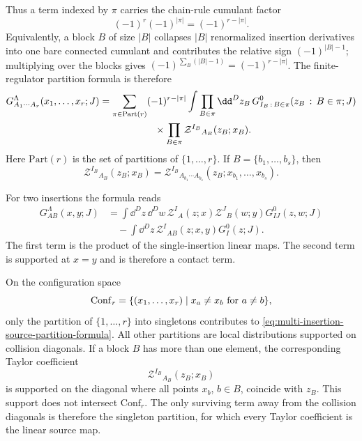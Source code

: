 Thus a term indexed by \(\pi\) carries the chain-rule cumulant factor
\[
  (-1)^r(-1)^{|\pi|}
  =
  (-1)^{r-|\pi|}.
\]
Equivalently, a block \(B\) of size \(|B|\) collapses \(|B|\) renormalized
insertion derivatives into one bare connected cumulant and contributes the
relative sign \((-1)^{|B|-1}\); multiplying over the blocks gives
\((-1)^{\sum_B(|B|-1)}=(-1)^{r-|\pi|}\).  The finite-regulator partition
formula is therefore
\begin{equation}
  \begin{aligned}
  G^\Lambda_{A_1\cdots A_r}(x_1,\ldots,x_r;J)
  &=
  \sum_{\pi\in\mathrm{Part}(r)}
  (-1)^{r-|\pi|}
  \int\prod_{B\in\pi}\dd^D z_B\,
  G^0_{I_B\,:\,B\in\pi}(z_B\,:\,B\in\pi;J)
  \\
  &\hspace{2.0cm}\times
  \prod_{B\in\pi}
  \mathcal Z^{I_B}{}_{A_B}
    (z_B;x_B).
  \end{aligned}
  \label{eq:multi-insertion-source-partition-formula}
\end{equation}
Here \(\mathrm{Part}(r)\) is the set of partitions of
\(\{1,\ldots,r\}\).  If \(B=\{b_1,\ldots,b_s\}\), then
\[
  \mathcal Z^{I_B}{}_{A_B}(z_B;x_B)
  =
  \mathcal Z^{I_B}{}_{A_{b_1}\cdots A_{b_s}}
    (z_B;x_{b_1},\ldots,x_{b_s}).
\]

For two insertions the formula reads
\begin{equation}
  \begin{aligned}
  G^\Lambda_{AB}(x,y;J)
  &=
  \int\dd^D z\,\dd^D w\,
  \mathcal Z^I{}_A(z;x)\mathcal Z^J{}_B(w;y)
  G^0_{IJ}(z,w;J)
  \\
  &\quad
  -
  \int\dd^D z\,
  \mathcal Z^I{}_{AB}(z;x,y)
  G^0_I(z;J).
  \end{aligned}
  \label{eq:two-insertion-contact-coordinate-formula}
\end{equation}
The first term is the product of the single-insertion linear maps.  The
second term is supported at \(x=y\) and is therefore a contact term.

On the configuration space
\[
  \mathrm{Conf}_r
  =
  \{(x_1,\ldots,x_r)\mid x_a\ne x_b\ {\rm for}\ a\ne b\},
\]
only the partition of \(\{1,\ldots,r\}\) into singletons contributes to
\eqref{eq:multi-insertion-source-partition-formula}.  All other partitions
are local distributions supported on collision diagonals.
If a block \(B\) has more than one element, the corresponding Taylor
coefficient
\[
  \mathcal Z^{I_B}{}_{A_B}(z_B;x_B)
\]
is supported on the diagonal where all points \(x_b\), \(b\in B\), coincide
with \(z_B\).  This support does not intersect \(\mathrm{Conf}_r\).  The only
surviving term away from the collision diagonals is therefore the singleton
partition, for which every Taylor coefficient is the linear source map.

